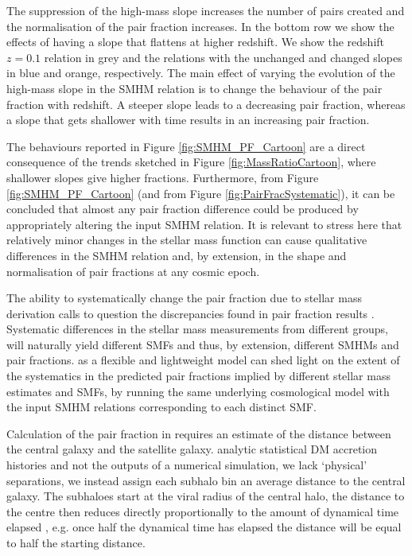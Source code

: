 The suppression of the high-mass slope increases the number of pairs created and the normalisation of the pair fraction increases. 
In the bottom row we show the effects of having a slope that flattens at higher redshift. 
We show the redshift $z=0.1$ relation in grey and the relations with the unchanged and changed slopes in blue and orange, respectively. 
The main effect of varying the evolution of the high-mass slope in the SMHM relation is to change the behaviour of the pair fraction with redshift. 
A steeper slope leads to a decreasing pair fraction, whereas a slope that gets shallower with time results in an increasing pair fraction.

The behaviours reported in Figure \ref{fig:SMHM_PF_Cartoon} are a direct consequence of the trends sketched in Figure \ref{fig:MassRatioCartoon}, where shallower slopes give higher fractions. 
Furthermore, from Figure \ref{fig:SMHM_PF_Cartoon} (and from Figure \ref{fig:PairFracSystematic}), it can be concluded that almost any pair fraction difference could be produced by appropriately altering the input SMHM relation. 
It is relevant to stress here that relatively minor changes in the stellar mass function can cause qualitative differences in the SMHM relation and, by extension, in the shape and normalisation of pair fractions at any cosmic epoch.

The ability to systematically change the pair fraction due to stellar mass derivation calls to question the discrepancies found in pair fraction results \citep[e.g.][]{Man2016RESOLVING03}. 
Systematic differences in the stellar mass measurements from different groups, will naturally yield different SMFs and thus, by extension, different SMHMs and pair fractions.  
\steel as a flexible and lightweight model can shed light on the extent of the systematics in the predicted pair fractions implied by different stellar mass estimates and SMFs, by running the same underlying cosmological model with the input SMHM relations corresponding to each distinct SMF.

Calculation of the pair fraction in \steel requires an estimate of the distance between the central galaxy and the satellite galaxy. analytic statistical DM accretion histories and not the outputs of a numerical simulation, we lack `physical' separations, we instead assign each subhalo bin an average distance to the central galaxy. 
The subhaloes start at the viral radius of the central halo, the distance to the centre then reduces directly proportionally to the amount of dynamical time elapsed \citep{Guo2011FromCosmology}, e.g. once half the dynamical time has elapsed the distance will be equal to half the starting distance.

